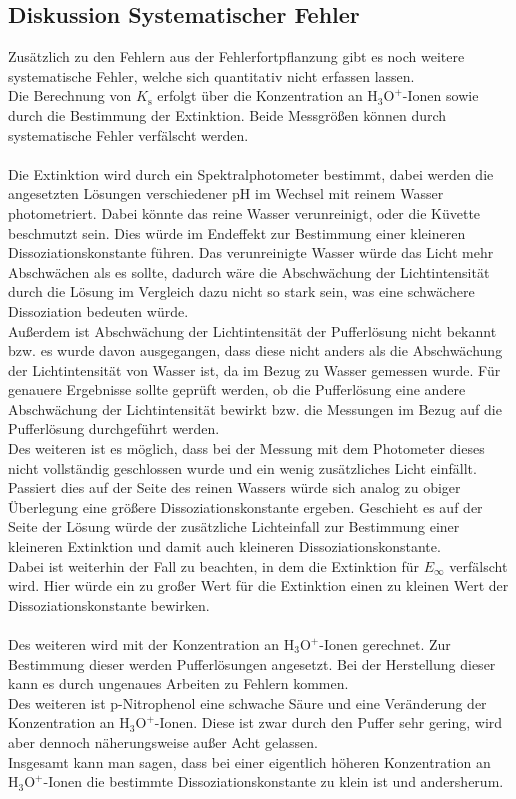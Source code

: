 \documentclass[12pt,a4paper,titlepage,headinclude,bibtotoc]{scrartcl}
\begin{document}
\subsection{Diskussion Systematischer Fehler}
Zusätzlich zu den Fehlern aus der Fehlerfortpflanzung gibt es noch weitere systematische Fehler, welche sich quantitativ nicht erfassen lassen.\\
Die Berechnung von $K_{\mathrm{s}}$ erfolgt über die Konzentration an $\mathrm{H_3 O^+}$-Ionen sowie durch die Bestimmung der Extinktion. Beide Messgrößen können durch systematische Fehler verfälscht werden.\\\\
Die Extinktion wird durch ein Spektralphotometer bestimmt, dabei werden die angesetzten Lösungen verschiedener pH im Wechsel mit reinem Wasser photometriert. Dabei könnte das reine Wasser verunreinigt, oder die Küvette beschmutzt sein. Dies würde im Endeffekt zur Bestimmung einer kleineren Dissoziationskonstante führen. Das verunreinigte Wasser würde das Licht mehr Abschwächen als es sollte, dadurch wäre die Abschwächung der Lichtintensität durch die Lösung im Vergleich dazu nicht so stark sein, was eine schwächere Dissoziation bedeuten würde.\\
Außerdem ist Abschwächung der Lichtintensität der Pufferlösung nicht bekannt bzw. es wurde davon ausgegangen, dass diese nicht anders als die Abschwächung der Lichtintensität von Wasser ist, da im Bezug zu Wasser gemessen wurde. Für genauere Ergebnisse sollte geprüft werden, ob die Pufferlösung eine andere Abschwächung der Lichtintensität bewirkt bzw. die Messungen im Bezug auf die Pufferlösung durchgeführt werden.\\

 Des weiteren ist es möglich, dass bei der Messung mit dem Photometer dieses nicht vollständig geschlossen wurde und ein wenig zusätzliches Licht einfällt. Passiert dies auf der Seite des reinen Wassers würde sich analog zu obiger Überlegung eine größere Dissoziationskonstante ergeben. Geschieht es auf der Seite der Lösung würde der zusätzliche Lichteinfall zur Bestimmung einer kleineren Extinktion und damit auch kleineren Dissoziationskonstante.\\ Dabei ist weiterhin der Fall zu beachten, in dem die Extinktion für $E_{\infty}$ verfälscht wird. Hier würde ein zu großer Wert für die Extinktion einen zu kleinen Wert der Dissoziationskonstante bewirken.\\\\
Des weiteren wird mit der Konzentration an $\mathrm{H_3 O^+}$-Ionen gerechnet. Zur Bestimmung dieser werden Pufferlösungen angesetzt. Bei der Herstellung dieser kann es durch ungenaues Arbeiten zu Fehlern kommen.\\ 
Des weiteren ist p-Nitrophenol eine schwache Säure und eine Veränderung der Konzentration an $\mathrm{H_3 O^+}$-Ionen. Diese ist zwar durch den Puffer sehr gering, wird aber dennoch näherungsweise außer Acht gelassen.\\
Insgesamt kann man sagen, dass bei einer eigentlich höheren Konzentration an $\mathrm{H_3 O^+}$-Ionen die bestimmte Dissoziationskonstante zu klein ist und andersherum.\\\\
     
\end{document}

